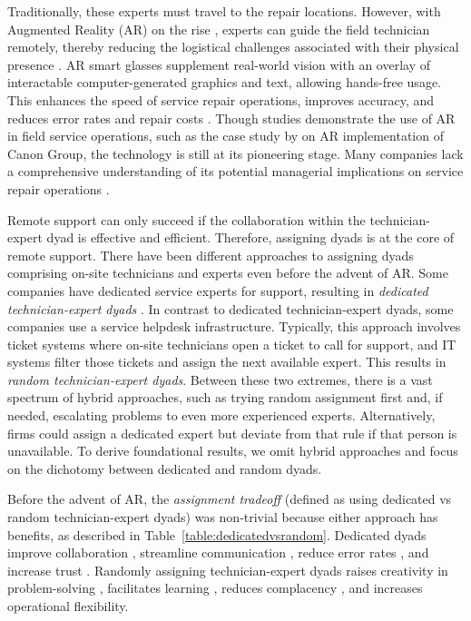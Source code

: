 \documentclass[msom,nonblindrev]{01 latex/class/informs3}
\begin{document}
Traditionally, these experts must travel to the repair locations. However, with Augmented Reality (AR) on the rise \citep{wuttke2022seeing, seeliger2023augmented}, experts can guide the field technician remotely, thereby reducing the logistical challenges associated with their physical presence \citep{porter2017HBR}. AR smart glasses supplement real-world vision with an overlay of interactable computer-generated graphics and text, allowing hands-free usage. This enhances the speed of service repair operations, improves accuracy, and reduces error rates and repair costs \citep{abraham2017HBR}. Though studies demonstrate the use of AR in field service operations, such as the case study by \citet{rapaccini2014evaluating} on AR implementation of Canon Group, the technology is still at its pioneering stage. Many companies lack a comprehensive understanding of its potential managerial implications on service repair operations \citep{coughlan2002action}.

Remote support can only succeed if the collaboration within the technician-expert dyad is effective and efficient. Therefore, assigning dyads is at the core of remote support. There have been different approaches to assigning dyads comprising on-site technicians and experts even before the advent of AR. Some companies have dedicated service experts for support, resulting in \emph{dedicated technician-expert dyads} \citep{voss1992applying}. In contrast to dedicated technician-expert dyads, some companies use a service helpdesk infrastructure. Typically, this approach involves ticket systems where on-site technicians open a ticket to call for support, and IT systems filter those tickets and assign the next available expert. This results in \emph{random technician-expert dyads}. Between these two extremes, there is a vast spectrum of hybrid approaches, such as trying random assignment first and, if needed, escalating problems to even more experienced experts. Alternatively, firms could assign a dedicated expert but deviate from that rule if that person is unavailable. To derive foundational results, we omit hybrid approaches and focus on the dichotomy between dedicated and random dyads.

Before the advent of AR, the \emph{assignment tradeoff} (defined as using dedicated vs random technician-expert dyads) was non-trivial because either approach has benefits, as described in Table~\ref{table:dedicatedvsrandom}. Dedicated dyads improve collaboration \citep{berman2002tacit, avgerinos2017team}, streamline communication \citep{cramton2001mutual}, reduce error rates \citep{kane2005knowledge, argote2012organizational}, and increase trust \citep{siemsen2009influence}. Randomly assigning technician-expert dyads raises creativity in problem-solving \citep{gruenfeld2000groups, choi2005old, edmondson2009product,ramachandran2017help}, facilitates learning \citep{kane2005knowledge, argote2012organizational}, reduces complacency \citep{dixon2018reinventing, ball2017plant}, and increases operational flexibility.%
\end{document}
